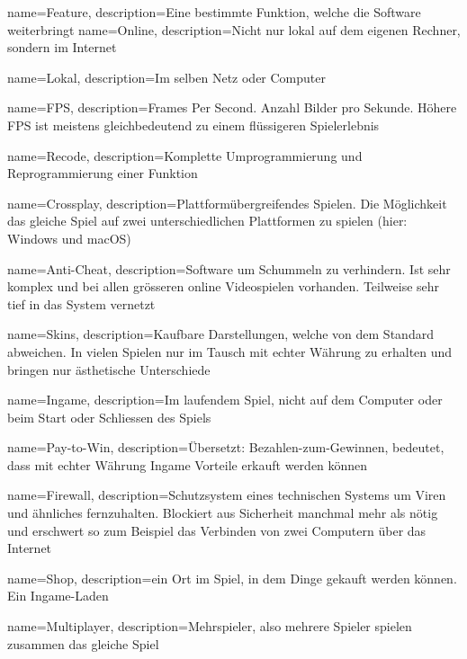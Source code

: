 
{
  name={Feature},
  description={Eine bestimmte Funktion, welche die Software weiterbringt}
}
{
  name={Online},
  description={Nicht nur lokal auf dem eigenen Rechner, sondern im Internet}
}

{
  name={Lokal},
  description={Im selben Netz oder Computer}
}

{
  name={FPS},
  description={Frames Per Second. Anzahl Bilder pro Sekunde. Höhere FPS ist meistens gleichbedeutend zu einem flüssigeren Spielerlebnis}
}

{
  name={Recode},
  description={Komplette Umprogrammierung und Reprogrammierung einer Funktion}
}

{
  name={Crossplay},
  description={Plattformübergreifendes Spielen. Die Möglichkeit das gleiche Spiel auf zwei unterschiedlichen Plattformen zu spielen (hier: Windows und macOS)}
}

{
  name={Anti-Cheat},
  description={Software um Schummeln zu verhindern.
  Ist sehr komplex und bei allen grösseren online Videospielen vorhanden.
  Teilweise sehr tief in das System vernetzt}
}

{
  name={Skins},
  description={Kaufbare Darstellungen, welche von dem Standard abweichen.
  In vielen Spielen nur im Tausch mit echter Währung zu erhalten und bringen nur ästhetische Unterschiede}
}

{
  name={Ingame},
  description={Im laufendem Spiel, nicht auf dem Computer oder beim Start oder Schliessen des Spiels}
}

{
  name={Pay-to-Win},
  description={Übersetzt: Bezahlen-zum-Gewinnen, bedeutet, dass mit echter Währung Ingame Vorteile erkauft werden können}
}

{
  name={Firewall},
  description={Schutzsystem eines technischen Systems um Viren und ähnliches fernzuhalten.
  Blockiert aus Sicherheit manchmal mehr als nötig und erschwert so zum Beispiel das Verbinden von zwei Computern über das Internet}
}

{
  name={Shop},
  description={ein Ort im Spiel, in dem Dinge gekauft werden können. Ein Ingame-Laden}
}


{
  name={Multiplayer},
  description={Mehrspieler, also mehrere Spieler spielen zusammen das gleiche Spiel}
}

